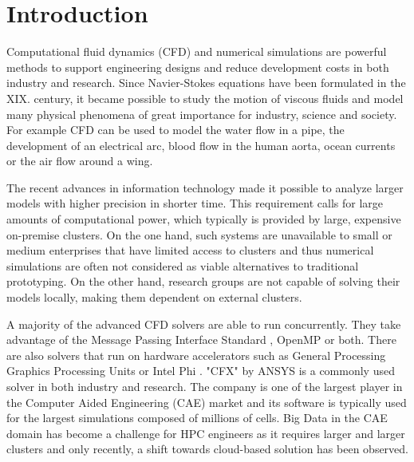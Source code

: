 \documentclass[3p,times]{elsarticle}
\begin{document}

\section{Introduction} 
\label{sec:introduction}

Computational fluid dynamics (CFD) and numerical simulations are powerful methods to support engineering designs and reduce development costs in both industry and research. Since Navier-Stokes equations have been formulated in the XIX. century, it became possible to study the motion of viscous fluids and model many physical phenomena of great importance for industry, science and society. For example CFD can be used to model the water flow in a pipe, the development of an electrical arc, blood flow in the human aorta, ocean currents or the air flow around a wing. 

The recent advances in information technology made it possible to analyze larger models with higher precision in shorter time. This requirement calls for large amounts of computational power, which typically is provided by large, expensive on-premise clusters. On the one hand, such systems are unavailable to small or medium enterprises that have limited access to clusters and thus numerical simulations are often not considered as viable alternatives to traditional prototyping. On the other hand, research groups are not capable of solving their models locally, making them dependent on external clusters.

A majority of the advanced CFD solvers are able to run concurrently. They take advantage of the Message Passing Interface Standard \cite{openfoam}, OpenMP or both. There are also solvers that run on hardware accelerators such as General Processing Graphics Processing Units \cite{tomczak2013} or Intel Phi \cite{Che09042015}. "CFX" by ANSYS is a commonly used solver in both industry and research. The company is one of the largest player in the Computer Aided Engineering (CAE) market \cite{mcae2012} and its software is typically used for the largest simulations composed of millions of cells. Big Data in the CAE domain has become a challenge for HPC engineers as it requires larger and larger clusters and only recently, a shift towards cloud-based solution has been observed.
\end{document}
